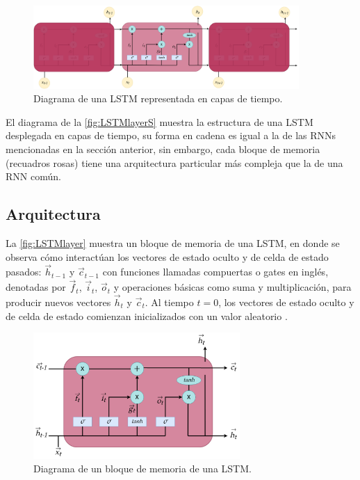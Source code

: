 \begin{figure}[!htbp]
  \centering
  \includegraphics[width=0.9\textwidth]{./img/LSTM_layerS.drawio.png}
  \caption{Diagrama de una \acs{LSTM} representada en capas de tiempo.}
  \label{fig:LSTMlayerS}
\end{figure}

El diagrama de la \autoref{fig:LSTMlayerS} muestra la estructura de una \acs{LSTM} desplegada en capas de tiempo, su forma en cadena es igual a la de las \acs{RNN}s mencionadas en la sección anterior, sin embargo, cada bloque de memoria (recuadros rosas) tiene una arquitectura particular más compleja que la de una \acs{RNN} común.

\subsection{Arquitectura}\label{sec:LSTM_Arch}
La \autoref{fig:LSTMlayer} muestra un bloque de memoria de una \acs{LSTM}, en donde se observa cómo interactúan los vectores de estado oculto y de celda de estado pasados: $\vec{h}_{t-1}$ y $\vec{c}_{t-1}$ con funciones llamadas compuertas o gates en inglés, denotadas por $\vec{f}_t$, $\vec{i}_t$, $\vec{o}_t$ y operaciones básicas como suma y multiplicación, para producir nuevos vectores $\vec{h}_{t}$ y $\vec{c}_{t}$. Al tiempo $t=0$, los vectores de estado oculto y de celda de estado comienzan inicializados con un valor aleatorio \cite{Olah}.

\begin{figure}[!htbp]
  \centering
  \includegraphics[width=0.7\textwidth]{./img/LSTM_layer.png}
  \caption{Diagrama de un bloque de memoria de una \acs{LSTM}.}
  \label{fig:LSTMlayer}
\end{figure}


